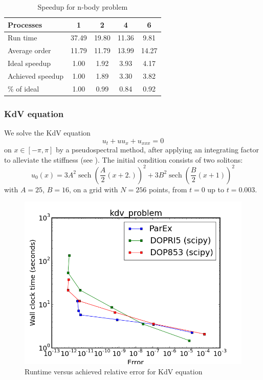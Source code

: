 \documentclass[12pt]{article}
\begin{document}
\begin{table}
\caption{Speedup for n-body problem\label{tbl:nbody}}{
\begin{tabular}{lcccc}\\
Processes & 1 & 2 & 4 & 6\\ \hline
Run time & 37.49 & 19.80 & 11.36 &  9.81 \\
Average order & 11.79 & 11.79 & 13.99 & 14.27 \\
Ideal speedup &  1.00 &  1.92 &  3.93 &  4.17 \\
Achieved speedup &  1.00 &  1.89 &  3.30 &  3.82 \\
\% of ideal &  1.00 &  0.99 &  0.84 &  0.92 \\ \hline
\end{tabular}}
\end{table}


\subsubsection{KdV equation }
We solve the KdV equation 
$$
u_t+uu_x+u_{xxx}=0
$$
on $x \in [-\pi,\pi]$  by a pseudospectral method, after applying an
integrating factor to alleviate the stiffness
(see \cite[pp. 111-112]{trefethen_spectral}).
The initial condition consists of two solitons:
$$
u_0(x) = 3A^2\mathop{sech}\left(\frac{A}{2}(x+2.)\right)^2 + 3B^2\mathop{sech}\left(\frac{B}{2}(x+1)\right)^2
$$
with $A=25$, $B=16$, on a grid with $N=256$ points, from $t=0$ up
to $t=0.003$.
\begin{figure}[h]
 \includegraphics[scale=0.5]{images/kdv_problem_err_vs_time.png}
\centering
\caption{Runtime versus achieved relative error for KdV equation}
\end{figure}
\end{document}
